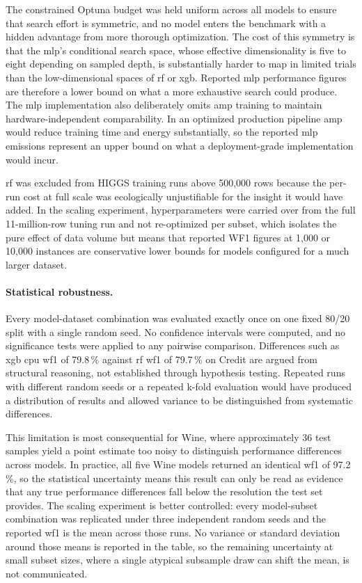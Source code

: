 The constrained Optuna budget was held uniform across all models to ensure that search effort is symmetric, and no model enters the benchmark with a hidden advantage from more thorough optimization. The cost of this symmetry is that the \gls{mlp}'s conditional search space, whose effective dimensionality is five to eight depending on sampled depth, is substantially harder to map in limited trials than the low-dimensional spaces of \gls{rf} or \gls{xgb}. Reported \gls{mlp} performance figures are therefore a lower bound on what a more exhaustive search could produce. The \gls{mlp} implementation also deliberately omits \gls{amp} training to maintain hardware-independent comparability. In an optimized production pipeline \gls{amp} would reduce training time and energy substantially, so the reported \gls{mlp} emissions represent an upper bound on what a deployment-grade implementation would incur.

\gls{rf} was excluded from HIGGS training runs above 500{,}000 rows because the per-run cost at full scale was ecologically unjustifiable for the insight it would have added. In the scaling experiment, hyperparameters were carried over from the full 11-million-row tuning run and not re-optimized per subset, which isolates the pure effect of data volume but means that reported WF1 figures at 1{,}000 or 10{,}000 instances are conservative lower bounds for models configured for a much larger dataset.

\paragraph{Statistical robustness.}
Every model-dataset combination was evaluated exactly once on one fixed 80/20 split with a single random seed. No confidence intervals were computed, and no significance tests were applied to any pairwise comparison. Differences such as \gls{xgb} \gls{cpu} \gls{wf1} of 79.8\,\% against \gls{rf} \gls{wf1} of 79.7\,\% on Credit are argued from structural reasoning, not established through hypothesis testing. Repeated runs with different random seeds or a repeated k-fold evaluation would have produced a distribution of results and allowed variance to be distinguished from systematic differences.

This limitation is most consequential for Wine, where approximately 36 test samples yield a point estimate too noisy to distinguish performance differences across models. In practice, all five Wine models returned an identical \gls{wf1} of 97.2\,\%, so the statistical uncertainty means this result can only be read as evidence that any true performance differences fall below the resolution the test set provides. The scaling experiment is better controlled: every model-subset combination was replicated under three independent random seeds and the reported \gls{wf1} is the mean across those runs. No variance or standard deviation around those means is reported in the table, so the remaining uncertainty at small subset sizes, where a single atypical subsample draw can shift the mean, is not communicated.





